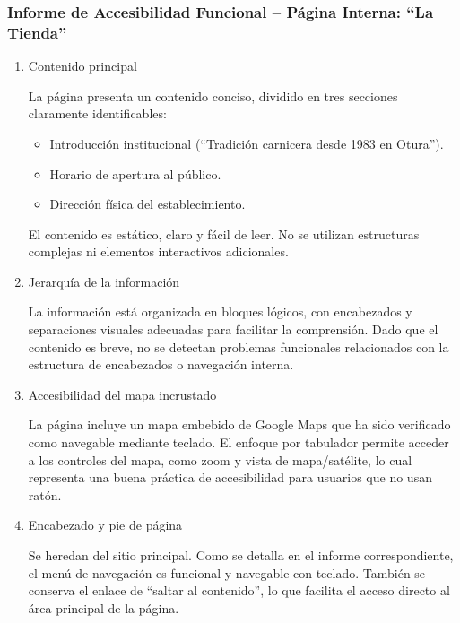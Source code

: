 \documentclass[a4paper]{article}
\begin{document}
\subsubsection{Informe de Accesibilidad Funcional – Página Interna: ``La Tienda''}

\begin{enumerate}
    \item Contenido principal

    La página presenta un contenido conciso, dividido en tres secciones claramente identificables:

    \begin{itemize}
        \item Introducción institucional (“Tradición carnicera desde 1983 en Otura”).

        \item Horario de apertura al público.

        \item Dirección física del establecimiento.
    \end{itemize}

    El contenido es estático, claro y fácil de leer. No se utilizan estructuras complejas ni elementos interactivos adicionales.

    \item Jerarquía de la información

    La información está organizada en bloques lógicos, con encabezados y separaciones visuales adecuadas para facilitar la comprensión. Dado que el contenido es breve, no se detectan problemas funcionales relacionados con la estructura de encabezados o navegación interna.

    \item Accesibilidad del mapa incrustado

    La página incluye un mapa embebido de Google Maps que ha sido verificado como navegable mediante teclado. El enfoque por tabulador permite acceder a los controles del mapa, como zoom y vista de mapa/satélite, lo cual representa una buena práctica de accesibilidad para usuarios que no usan ratón.

    \item Encabezado y pie de página

    Se heredan del sitio principal. Como se detalla en el informe correspondiente, el menú de navegación es funcional y navegable con teclado. También se conserva el enlace de “saltar al contenido”, lo que facilita el acceso directo al área principal de la página.


\end{enumerate}
\end{document}
